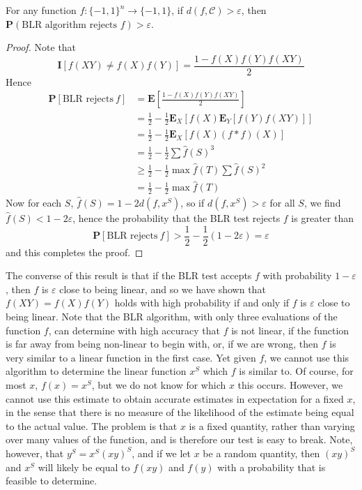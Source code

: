\begin{theorem}
    For any function $f: \{ -1, 1 \}^n \to \{ -1, 1 \}$, if $d(f,\mathcal{C}) > \varepsilon$, then $\mathbf{P}(\text{BLR algorithm rejects $f$}) > \varepsilon$.
\end{theorem}
\begin{proof}
    Note that
    \[ \mathbf{I}[f(XY) \neq f(X)f(Y)] = \frac{1 - f(X)f(Y)f(XY)}{2} \]
    Hence
    \begin{align*}
        \mathbf{P}[\text{BLR rejects}\ f] &= \mathbf{E} \left[ \frac{1 - f(X)f(Y)f(XY)}{2} \right]\\
        &= \frac{1}{2} - \frac{1}{2} \mathbf{E}_X[f(X) \mathbf{E}_Y[f(Y) f(XY)]]\\
        &= \frac{1}{2} - \frac{1}{2} \mathbf{E}_X[f(X) (f * f)(X)]\\
        &= \frac{1}{2} - \frac{1}{2} \sum \widehat{f}(S)^3\\
        &\geq \frac{1}{2} - \frac{1}{2} \max \widehat{f}(T) \sum \widehat{f}(S)^2\\
        &= \frac{1}{2} - \frac{1}{2} \max \widehat{f}(T)
    \end{align*}
    Now for each $S$, $\widehat{f}(S) = 1 - 2 d(f, x^S)$, so if $d(f,x^S) > \varepsilon$ for all $S$, we find $\widehat{f}(S) < 1 - 2 \varepsilon$, hence the probability that the BLR test rejects $f$ is greater than
    \[ \mathbf{P}[\text{BLR rejects}\ f] > \frac{1}{2} - \frac{1}{2} (1 - 2 \varepsilon) = \varepsilon \]
    and this completes the proof.
\end{proof}

The converse of this result is that if the BLR test accepts $f$ with probability $1 - \varepsilon$, then $f$ is $\varepsilon$ close to being linear, and so we have shown that $f(XY) = f(X)f(Y)$ holds with high probability if and only if $f$ is $\varepsilon$ close to being linear. Note that the BLR algorithm, with only three evaluations of the function $f$, can determine with high accuracy that $f$ is not linear, if the function is far away from being non-linear to begin with, or, if we are wrong, then $f$ is very similar to a linear function in the first case. Yet given $f$, we cannot use this algorithm to determine the linear function $x^S$ which $f$ is similar to. Of course, for most $x$, $f(x) = x^S$, but we do not know for which $x$ this occurs. However, we cannot use this estimate to obtain accurate estimates in expectation for a fixed $x$, in the sense that there is no measure of the likelihood of the estimate being equal to the actual value. The problem is that $x$ is a fixed quantity, rather than varying over many values of the function, and is therefore our test is easy to break. Note, however, that $y^S = x^S (xy)^S$, and if we let $x$ be a random quantity, then $(xy)^S$ and $x^S$ will likely be equal to $f(xy)$ and $f(y)$ with a probability that is feasible to determine.

